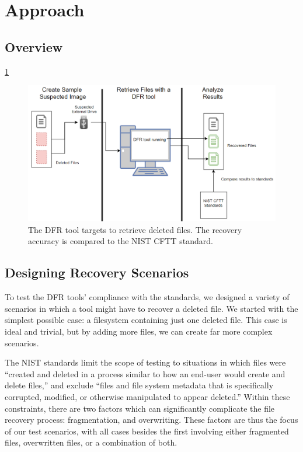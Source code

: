 \section{Approach}

\subsection{Overview}

\ref{fig:overview}

\begin{figure}[h]
    \centering
    \includegraphics[width=\linewidth]{fig/overview.png}
    \caption{The DFR tool targets to retrieve deleted files. The recovery accuracy is compared to the NIST CFTT standard.}
    \label{fig:overview}
\end{figure}

\subsection{Designing Recovery Scenarios}
To test the DFR tools' compliance with the standards, we designed a variety of scenarios in which a tool might have to recover a deleted file. We started with the simplest possible case: a filesystem containing just one deleted file. This case is ideal and trivial, but by adding more files, we can create far more complex scenarios.

The NIST standards limit the scope of testing to situations in which files were ``created and deleted in a process similar to how an end-user would create and delete files,''\cite{meta:dfr:standards} and  exclude ``files and file system metadata that is specifically corrupted, modified, or otherwise manipulated to appear deleted.''\cite{meta:dfr:standards}
Within these constraints, there are two factors which can significantly complicate the file recovery process: fragmentation, and overwriting. %
These factors are thus the focus of our test scenarios, with all cases besides the first involving either fragmented files, overwritten files, or a combination of both.

